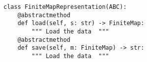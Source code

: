 \par\begin{minipage}{60ex}
\begin{verbatim}
class FiniteMapRepresentation(ABC):
    @abstractmethod
    def load(self, s: str) -> FiniteMap:
        """ Load the data  """
    @abstractmethod
    def save(self, m: FiniteMap) -> str:
        """ Load the data  """
\end{verbatim}
\end{minipage}\par